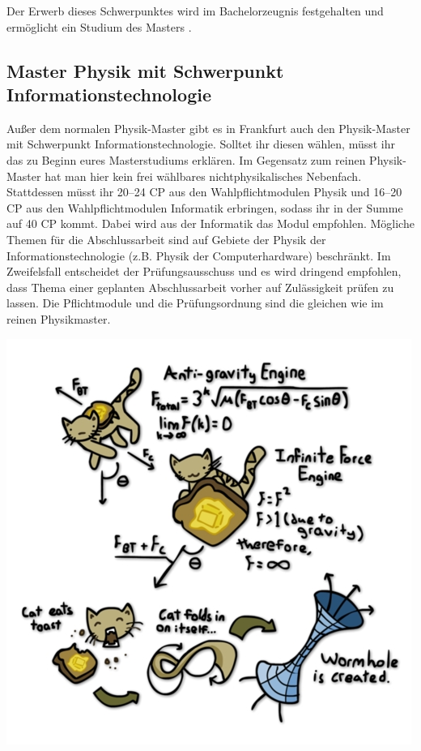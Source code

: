 Der Erwerb dieses Schwerpunktes wird im Bachelorzeugnis festgehalten
und ermöglicht ein Studium des Masters .\\

%
%
\newpage
\subsection{Master Physik mit Schwerpunkt Informationstechnologie}
\medskip
Außer dem normalen Physik-Master gibt es in Frankfurt auch den Physik-Master mit Schwerpunkt Informationstechnologie.
Solltet ihr diesen wählen, müsst ihr das zu Beginn eures Masterstudiums erklären.
Im Gegensatz zum reinen Physik-Master hat man hier kein frei wählbares nichtphysikalisches Nebenfach.
Stattdessen müsst ihr 20--24 CP aus den Wahlpflichtmodulen Physik und 16--20 CP aus den Wahlpflichtmodulen Informatik erbringen, sodass ihr in der Summe auf 40 CP kommt.
Dabei wird aus der Informatik das Modul  empfohlen.
Mögliche Themen für die Abschlussarbeit sind auf Gebiete der Physik der Informationstechnologie (z.B. Physik der Computerhardware) beschränkt.
Im Zweifelsfall entscheidet der Prüfungsausschuss und es wird dringend empfohlen, dass Thema einer geplanten Abschlussarbeit vorher auf Zulässigkeit prüfen zu lassen.
Die Pflichtmodule und die Prüfungsordnung sind die gleichen wie im reinen Physikmaster.

\begin{center}
  \includegraphics[height=.63\textheight]{bilder/Katze_Toast.jpg}
\end{center}


